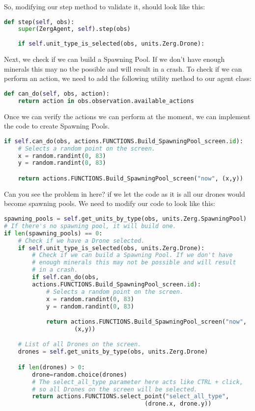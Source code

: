 \documentclass[11pt]{report}            %
\begin{document}
So, modifying our step method to validate it, should look like this:
\begin{lstlisting}[language=Python]
def step(self, obs):
    super(ZergAgent, self).step(obs)
    
    if self.unit_type_is_selected(obs, units.Zerg.Drone):
\end{lstlisting}

Next, we check if we can build a Spawning Pool. If we don't have enough minerals this may no tbe possible and will result in a crash. To check if we can perform an action, we need to add the following utility method to our agent class:
\begin{lstlisting}[language=Python]
def can_do(self, obs, action):
    return action in obs.observation.available_actions
\end{lstlisting}

Once we can verify the actions we can perform at the moment, we can implement the code to create Spawning Pools.
\begin{lstlisting}[language=Python]
if self.can_do(obs, actions.FUNCTIONS.Build_SpawningPool_screen.id):
    # Selects a random point on the screen.
    x = random.randint(0, 83)
    y = random.randint(0, 83)

    return actions.FUNCTIONS.Build_SpawningPool_screen("now", (x,y))
\end{lstlisting}

Can you see the problem in here? if we let the code as it is all our drones would become spawning pools. We need to modify our code to look like this:
\begin{lstlisting}[language=Python]
spawning_pools = self.get_units_by_type(obs, units.Zerg.SpawningPool)
# If there's no spawning pool, it will build one.
if len(spawning_pools) == 0:
    # Check if we have a Drone selected.
    if self.unit_type_is_selected(obs, units.Zerg.Drone):
        # Check if we can build a Spawning Pool. If we don't have
        # enough minerals this may not be possible and will result
        # in a crash.
        if self.can_do(obs,
        actions.FUNCTIONS.Build_SpawningPool_screen.id):
            # Selects a random point on the screen.
            x = random.randint(0, 83)
            y = random.randint(0, 83)

            return actions.FUNCTIONS.Build_SpawningPool_screen("now",
                    (x,y))

    # List of all Drones on the screen.
    drones = self.get_units_by_type(obs, units.Zerg.Drone)

    if len(drones) > 0:
        drone=random.choice(drones)
        # The select_all_type parameter here acts like CTRL + click,
        # so all Drones on the screen will be selected.
        return actions.FUNCTIONS.select_point("select_all_type",
                                        (drone.x, drone.y))
\end{lstlisting}
\end{document}

